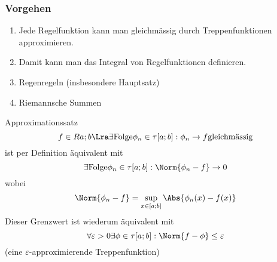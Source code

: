 \subsubsection{Vorgehen}
\begin{enumerate}
    \item Jede Regelfunktion kann man gleichmässig durch Treppenfunktionen approximieren.
    \item Damit kann man das Integral von Regelfunktionen definieren.
    \item Regenregeln (insbesondere Hauptsatz)
    \item Riemannsche Summen
\end{enumerate}
\begin{Sat}{Approximationssatz}
  \[f\in R{a;b}\Lra \exists \text{Folge} \phi_n\in \tau[a;b]:\phi_n\to f\text{gleichmässig}\]  
  ist per Definition äquivalent mit
  \[\exists \text{Folge}\phi_n\in \tau[a;b]: \Norm{\phi_n-f}\to 0\]
  wobei
  \[\Norm{\phi_n-f}=\sup_{x\in[a;b]}\Abs{\phi_n(x)-f(x)}\]
  Dieser Grenzwert ist wiederum äquivalent mit
  \[\forall\varepsilon>0 \exists\phi \in \tau[a;b]: \Norm{f-\phi}\leq \varepsilon\]
  (eine $\varepsilon$-approximierende Treppenfunktion)
\end{Sat}
